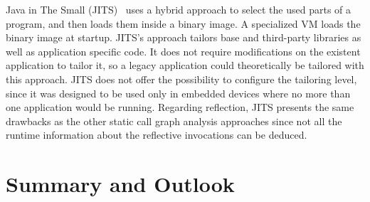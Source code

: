 Java in The Small (JITS)~\cite{ShortCour10a} uses a hybrid approach to select the used parts of a program, and then loads them inside a binary image. A specialized VM loads the binary image at startup. JITS's approach tailors base and third-party libraries as well as application specific code. It does not require modifications on the existent application to tailor it, so a legacy application could theoretically be tailored with this approach. JITS does not offer the possibility to configure the tailoring level, since it was designed to be used only in embedded devices where no more than one application would be running. Regarding reflection, JITS presents the same drawbacks as the other static call graph analysis approaches since not all the runtime information about the reflective invocations can be deduced.

\section{Summary and Outlook}


